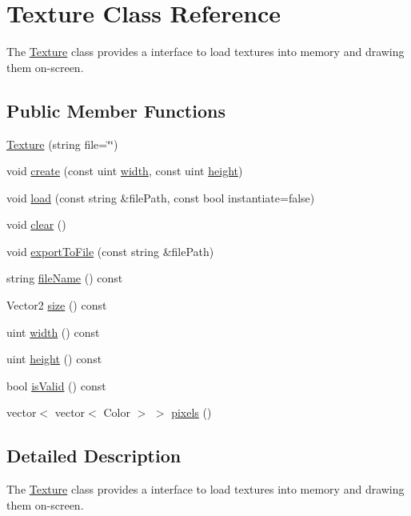 \hypertarget{class_texture}{\section{Texture Class Reference}
\label{class_texture}
}


The \hyperlink{class_texture}{Texture} class provides a interface to load textures into memory and drawing them on-\/screen.  


\subsection*{Public Member Functions}
\begin{DoxyCompactItemize}
\item 
\hyperlink{class_texture_a38d93b339061e4dd1a08e8ffa29a1a44}{Texture} (string file=\char`\"{}\char`\"{})
\item 
void \hyperlink{class_texture_ae40122ca5f4db8841cd2f8af4a806394}{create} (const uint \hyperlink{class_texture_a7f6ae152488c02fd955f5deda6e352d2}{width}, const uint \hyperlink{class_texture_ab098175db1d10781eb8f446964ba3ca6}{height})
\item 
void \hyperlink{class_texture_a0ea04189337a9ab01defe670280d9c56}{load} (const string \&file\-Path, const bool instantiate=false)
\item 
void \hyperlink{class_texture_ac8bb3912a3ce86b15842e79d0b421204}{clear} ()
\item 
void \hyperlink{class_texture_a98ee56ba9d8e7eb322310227d9a01ee9}{export\-To\-File} (const string \&file\-Path)
\item 
string \hyperlink{class_texture_ae07e8b59383d2dafbb5ad4641f8c86c3}{file\-Name} () const 
\item 
Vector2 \hyperlink{class_texture_aee725f563b16e074dc415626b4655beb}{size} () const 
\item 
uint \hyperlink{class_texture_a7f6ae152488c02fd955f5deda6e352d2}{width} () const 
\item 
uint \hyperlink{class_texture_ab098175db1d10781eb8f446964ba3ca6}{height} () const 
\item 
bool \hyperlink{class_texture_aac1b70a2ed67ead038c4d3f5ac4d8a81}{is\-Valid} () const 
\item 
vector$<$ vector$<$ Color $>$ $>$ \hyperlink{class_texture_a18729343f3dbcea6fcfa71020de2ffe2}{pixels} ()
\end{DoxyCompactItemize}


\subsection{Detailed Description}
The \hyperlink{class_texture}{Texture} class provides a interface to load textures into memory and drawing them on-\/screen. 

